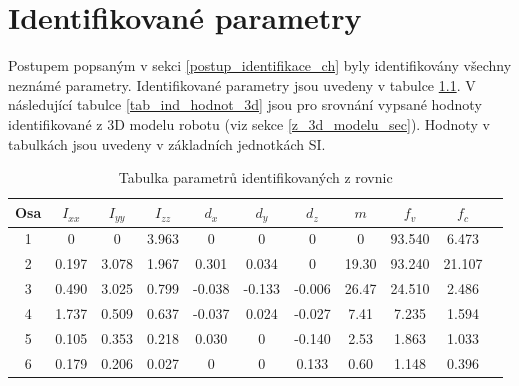

\chapter{Identifikované parametry}
\label{identifikovane_parametry_ch}
Postupem popsaným v sekci \ref{postup_identifikace_ch} byly identifikovány všechny neznámé parametry. Identifikované parametry jsou uvedeny v tabulce \ref{tab_ind_hodnot}. V následující tabulce \ref{tab_ind_hodnot_3d} jsou pro srovnání vypsané hodnoty identifikované z 3D modelu robotu (viz sekce \ref{z_3d_modelu_sec}). Hodnoty v tabulkách jsou uvedeny v základních jednotkách SI. 
\\
\begin{table}[htbp]
  \centering
  \caption{Tabulka parametrů identifikovaných z rovnic}
    \begin{tabular}{c|cccccccccc}
    \multicolumn{1}{c|}{Osa} & \multicolumn{1}{c}{$I_{xx}$} & \multicolumn{1}{c}{$I_{yy}$} & \multicolumn{1}{c}{$I_{zz}$} & \multicolumn{1}{c}{$d_x$} & \multicolumn{1}{c}{$d_y$} & \multicolumn{1}{c}{$d_z$} & \multicolumn{1}{c}{$m$} & \multicolumn{1}{c}{$f_v$} & \multicolumn{1}{c}{$f_c$} \\
    \hline
    1  & 0     & 0     & 3.963 & 0     & 0     & 0     & 0     & 93.540 &  6.473 \\
    2  & 0.197 & 3.078 & 1.967 & 0.301 & 0.034 & 0     & 19.30 & 93.240 & 21.107 \\
    3  & 0.490 & 3.025 & 0.799 &-0.038 &-0.133 &-0.006 & 26.47 & 24.510 &  2.486 \\
    4  & 1.737 & 0.509 & 0.637 &-0.037 & 0.024 &-0.027 & 7.41  &  7.235 &  1.594 \\
    5  & 0.105 & 0.353 & 0.218 & 0.030 & 0     &-0.140 & 2.53  &  1.863 &  1.033 \\
    6  & 0.179 & 0.206 & 0.027 & 0     & 0     & 0.133 & 0.60  &  1.148 &  0.396 \\
    \end{tabular}%
  \label{tab_ind_hodnot}%
\end{table}%

